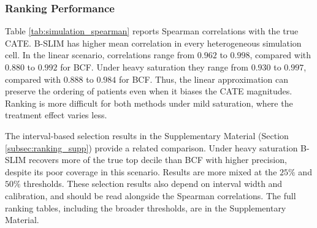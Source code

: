 \documentclass[12pt]{article}
\begin{document}
\subsubsection{Ranking Performance}

Table \ref{tab:simulation_spearman} reports Spearman correlations with the true CATE. B-SLIM has higher mean correlation in every heterogeneous simulation cell. In the linear scenario, correlations range from $0.962$ to $0.998$, compared with $0.880$ to $0.992$ for BCF. Under heavy saturation they range from $0.930$ to $0.997$, compared with $0.888$ to $0.984$ for BCF. Thus, the linear approximation can preserve the ordering of patients even when it biases the CATE magnitudes. Ranking is more difficult for both methods under mild saturation, where the treatment effect varies less.

The interval-based selection results in the Supplementary Material (Section \ref{subsec:ranking_supp}) provide a related comparison. Under heavy saturation B-SLIM recovers more of the true top decile than BCF with higher precision, despite its poor coverage in this scenario. Results are more mixed at the $25\%$ and $50\%$ thresholds. These selection results also depend on interval width and calibration, and should be read alongside the Spearman correlations. The full ranking tables, including the broader thresholds, are in the Supplementary Material.
\end{document}
